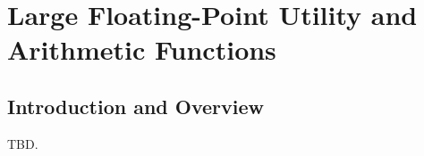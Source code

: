 \chapter[Large Floating-Point Utility and Arithmetic Functions]
        {Large Floating-Point Utility and Arithmetic Functions}


\label{claf2}

\section{Introduction and Overview}
\label{claf2:siov0}

TBD.

